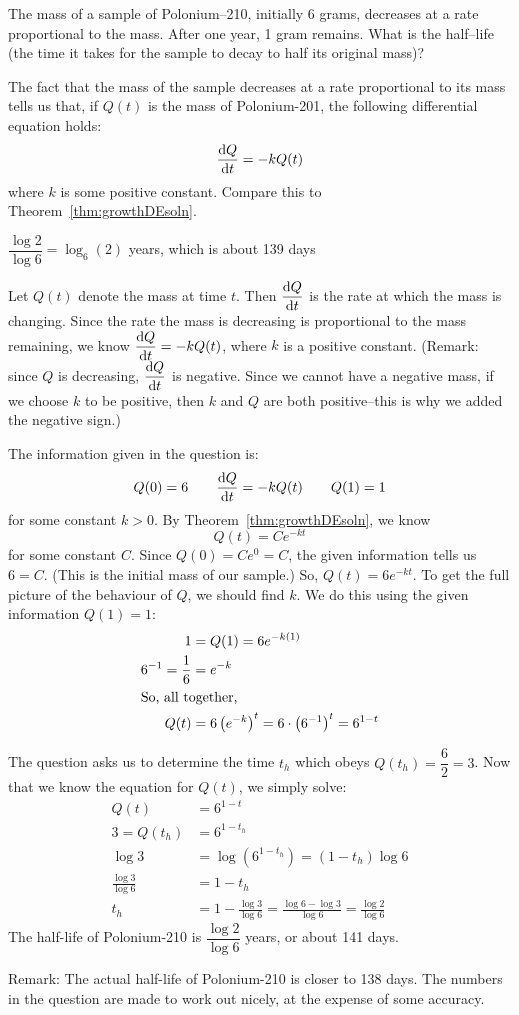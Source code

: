 \begin{question}[2006H]
The mass of a sample of Polonium--210, initially 6 grams,
decreases at a rate proportional to the mass. After one year, 1 gram remains.
What is the half--life (the time it takes for the sample to decay to half
its original mass)?
\end{question}
\begin{hint}
The fact that the mass of the sample decreases at a rate proportional to its mass tells us that, if $Q(t)$ is the mass of Polonium-201, the following differential equation holds:
\[\diff{Q}{t}=-kQ(t)\]
where $k$ is some positive constant. Compare this to Theorem~\ref*{thm:growthDEsoln}.
\end{hint}
\begin{answer} $\dfrac{\log 2}{\log 6}=\log_6(2)$ years, which is about 139 days
\end{answer}
\begin{solution}
Let $Q(t)$ denote the mass at time $t$.
Then $\ds\diff{Q}{t}$ is the rate at which the mass is changing. Since the rate the mass is decreasing is proportional to the mass remaining, we know $\ds\diff{Q}{t}=-kQ(t)$, where $k$ is a positive constant. (Remark: since $Q$ is decreasing, $\ds\diff{Q}{t}$ is negative. Since we cannot have a negative mass, if we choose $k$ to be positive, then $k$ and $Q$ are both positive--this is why we added the negative sign.)

The information given in the question is:
$$
Q(0)=6\qquad
\diff{Q}{t}=-kQ(t)\qquad
Q(1)=1
$$
for some constant $k>0$.
By Theorem~\ref*{thm:growthDEsoln}, we know \[Q(t)=Ce^{-kt}\] for some constant $C$.
Since $Q(0)=Ce^{0}=C$, the given information tells us $6=C$. (This is the initial mass of our sample.) So, $Q(t)=6e^{-kt}$. To get the full picture of the behaviour of $Q$, we should find $k$. We do this using the given information $Q(1)=1$:
\begin{align*}
1&=Q(1)=6e^{-k(1)}\\
6^{-1}=\frac{1}{6}&=e^{-k}\\
\intertext{So, all together,}
Q(t)&=6\left(e^{-k}\right)^t=6\cdot \left(6^{-1}\right)^t=6^{1-t}
\end{align*}

The question asks us to determine the time $t_{h}$ which obeys
$Q(t_{h})=\dfrac{6}{2}=3$. Now that we know the equation for $Q(t)$, we simply solve:
\begin{align*}
Q(t)&=6^{1-t}\\
3=Q(t_h)&=6^{1-t_{h}}\\
\log 3 &=\log\left(6^{1-t_h}\right)=(1-t_h)\log 6\\
\frac{\log 3}{\log 6}&=1-t_h\\
t_h&=1-\frac{\log 3}{\log 6}=\frac{\log 6-\log 3}{\log 6}=\frac{\log 2}{\log 6}
\end{align*}
The half-life of Polonium-210 is $\dfrac{\log 2}{\log 6}$ years, or about 141 days.

Remark:  The actual half-life of Polonium-210 is closer to 138 days. The numbers in the question are made to work out nicely, at the expense of some accuracy.
\end{solution}





